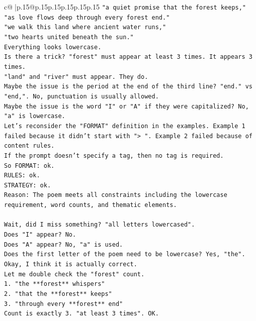 \documentclass{article}
\begin{document}
{\begin{supertabular}{c@{$\;$}|p{.15\linewidth}@{}p{.15\linewidth}p{.15\linewidth}p{.15\linewidth}p{.15\linewidth}p{.15\linewidth}}
{{{\texttt{"a quiet promise that the forest keeps,"} \\
\texttt{"as love flows deep through every forest end."} \\
\texttt{"we walk this land where ancient water runs,"} \\
\texttt{"two hearts united beneath the sun."} \\
\texttt{Everything looks lowercase.} \\
\texttt{Is there a trick? "forest" must appear at least 3 times. It appears 3 times.} \\
\texttt{"land" and "river" must appear. They do.} \\
\texttt{Maybe the issue is the period at the end of the third line? "end." vs "end,". No, punctuation is usually allowed.} \\
\texttt{Maybe the issue is the word "I" or "A" if they were capitalized? No, "a" is lowercase.} \\
\texttt{Let's reconsider the "FORMAT" definition in the examples. Example 1 failed because it didn't start with "> ". Example 2 failed because of content rules.} \\
\texttt{If the prompt doesn't specify a tag, then no tag is required.} \\
\texttt{So FORMAT: ok.} \\
\texttt{RULES: ok.} \\
\texttt{STRATEGY: ok.} \\
\texttt{Reason: The poem meets all constraints including the lowercase requirement, word counts, and thematic elements.} \\
\\ 
\texttt{Wait, did I miss something? "all letters lowercased".} \\
\texttt{Does "I" appear? No.} \\
\texttt{Does "A" appear? No, "a" is used.} \\
\texttt{Does the first letter of the poem need to be lowercase? Yes, "the".} \\
\texttt{Okay, I think it is actually correct.} \\
\texttt{Let me double check the "forest" count.} \\
\texttt{1. "the **forest** whispers"} \\
\texttt{2. "that the **forest** keeps"} \\
\texttt{3. "through every **forest** end"} \\
\texttt{Count is exactly 3. "at least 3 times". OK.} \\
}}}
\end{supertabular}}
\end{document}

